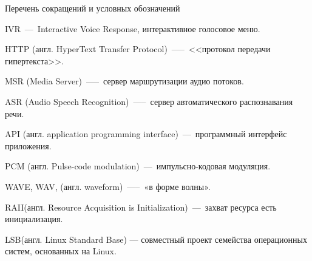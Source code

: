 \begin{center}
    \large
    Перечень сокращений и условных обозначений
\end{center}

\hypertarget{ivr}{IVR~---~Interactive Voice Response, интерактивное голосовое меню.}

\hypertarget{http}{HTTP (англ. HyperText Transfer Protocol)~—--~<<протокол передачи \\ \mbox{гипертекста}>>.}

\hypertarget{msr}{MSR (Media Server)~—--~сервер маршрутизации аудио потоков.}

\hypertarget{asr}{ASR (Audio Speech Recognition)~—--~сервер автоматического распознавания речи.}

\hypertarget{api}{API (англ. application programming interface)~---~программный интерфейс приложения.}

\hypertarget{pcm}{PCM (англ. Pulse-code modulation)~---~импульсно-кодовая модуляция.}

\hypertarget{wav}{WAVE, WAV, (англ. waveform)~—--~«в форме волны».}

\hypertarget{raii}{RAII(англ. Resource Acquisition is Initialization)~---~захват ресурса есть инициализация.}

\hypertarget{lsb}{LSB(англ. Linux Standard Base) — совместный проект семейства операционных систем, основанных на Linux.}

\clearpage
